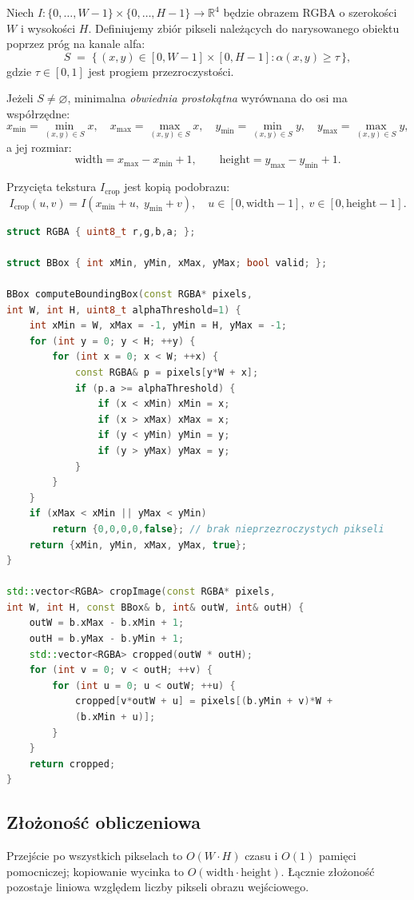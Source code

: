 \documentclass[a4paper,12pt]{book} %
\begin{document}
Niech \(I\colon \{0,\ldots,W-1\}\times\{0,\ldots,H-1\}\to \mathbb{R}^4\) będzie obrazem RGBA o szerokości \(W\) i wysokości \(H\).
Definiujemy zbiór pikseli należących do narysowanego obiektu poprzez próg na kanale alfa:
\[
S \;=\; \{\, (x,y)\in [0,W\!-\!1]\times[0,H\!-\!1] : \alpha(x,y) \ge \tau \,\},
\]
gdzie \(\tau\in[0,1]\) jest progiem przezroczystości.

Jeżeli \(S\neq\varnothing\), minimalna \emph{obwiednia prostokątna} wyrównana do osi ma współrzędne:
\[
x_{\min}=\min_{(x,y)\in S} x,\quad
x_{\max}=\max_{(x,y)\in S} x,\quad
y_{\min}=\min_{(x,y)\in S} y,\quad
y_{\max}=\max_{(x,y)\in S} y,
\]
a jej rozmiar:
\[
\text{width}=x_{\max}-x_{\min}+1,\qquad
\text{height}=y_{\max}-y_{\min}+1.
\]

Przycięta tekstura \(I_{\text{crop}}\) jest kopią podobrazu:
\[
I_{\text{crop}}(u,v)=I(x_{\min}+u,\; y_{\min}+v),\quad
u\in[0,\text{width}-1],\; v\in[0,\text{height}-1].
\]

\begin{lstlisting}[language=C++, caption={Przykład wyznaczania prostokątnej obwiedni i przycinania (cropping)}, label={lst:crop_bbox}]
struct RGBA { uint8_t r,g,b,a; };

struct BBox { int xMin, yMin, xMax, yMax; bool valid; };

BBox computeBoundingBox(const RGBA* pixels, 
int W, int H, uint8_t alphaThreshold=1) {
    int xMin = W, xMax = -1, yMin = H, yMax = -1;
    for (int y = 0; y < H; ++y) {
        for (int x = 0; x < W; ++x) {
            const RGBA& p = pixels[y*W + x];
            if (p.a >= alphaThreshold) {
                if (x < xMin) xMin = x;
                if (x > xMax) xMax = x;
                if (y < yMin) yMin = y;
                if (y > yMax) yMax = y;
            }
        }
    }
    if (xMax < xMin || yMax < yMin) 
        return {0,0,0,0,false}; // brak nieprzezroczystych pikseli
    return {xMin, yMin, xMax, yMax, true};
}

std::vector<RGBA> cropImage(const RGBA* pixels,
int W, int H, const BBox& b, int& outW, int& outH) {
    outW = b.xMax - b.xMin + 1;
    outH = b.yMax - b.yMin + 1;
    std::vector<RGBA> cropped(outW * outH);
    for (int v = 0; v < outH; ++v) {
        for (int u = 0; u < outW; ++u) {
            cropped[v*outW + u] = pixels[(b.yMin + v)*W +
            (b.xMin + u)];
        }
    }
    return cropped;
}
\end{lstlisting}

\subsection*{Złożoność obliczeniowa}
Przejście po wszystkich pikselach to \(O(W\cdot H)\) czasu i \(O(1)\) pamięci pomocniczej; kopiowanie wycinka to \(O(\text{width}\cdot \text{height})\).
Łącznie złożoność pozostaje liniowa względem liczby pikseli obrazu wejściowego.
\end{document}
